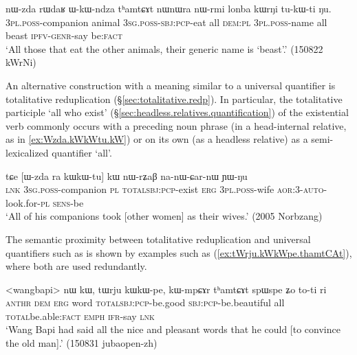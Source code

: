 \begin{exe}
\ex \label{ex:nWrmi.lonba}
\gll nɯ-zda rɯdaʁ ɯ-kɯ-ndza tʰamtɕɤt nɯnɯra nɯ-rmi lonba kɯrŋi tu-kɯ-ti ŋu. \\
\textsc{3pl}.\textsc{poss}-companion animal \textsc{3sg}.\textsc{poss}-\textsc{sbj}:\textsc{pcp}-eat all \textsc{dem}:\textsc{pl} \textsc{3pl}.\textsc{poss}-name all beast \textsc{ipfv}-\textsc{genr}-say be:\textsc{fact} \\ 
 \glt `All those that eat the other animals, their generic name is `beast'.'  (150822 kWrNi)
\end{exe}
 
An alternative construction with a meaning similar to a universal quantifier is totalitative reduplication (§\ref{sec:totalitative.redp}). In particular, the totalitative participle  `all who exist' (§\ref{sec:headless.relatives.quantification}) of the existential verb  commonly occurs with a preceding noun phrase (in a head-internal relative, as in \ref{ex:Wzda.kWkWtu.kW}) or on its own (as a headless relative) as a semi-lexicalized quantifier `all'. 

\begin{exe}
\ex \label{ex:Wzda.kWkWtu.kW}
\gll tɕe [ɯ-zda ra kɯ\redp{}kɯ-tu] kɯ nɯ-rʑaβ na-nɯ-ɕar-nɯ ɲɯ-ŋu \\
\textsc{lnk} \textsc{3sg}.\textsc{poss}-companion \textsc{pl} \textsc{total}\redp{}\textsc{sbj}:\textsc{pcp}-exist \textsc{erg} \textsc{3pl}.\textsc{poss}-wife \textsc{aor}:3\flobv{}-\textsc{auto}-look.for-\textsc{pl} \textsc{sens}-be \\
\glt `All of his companions took [other women] as their wives.' (2005 Norbzang)
\end{exe}
  
The semantic proximity between totalitative reduplication and universal quantifiers such as  is shown by examples such as (\ref{ex:tWrju.kWkWpe.thamtCAt}), where both are used redundantly.

\begin{exe}
\ex \label{ex:tWrju.kWkWpe.thamtCAt}
\gll   <wangbapi> nɯ kɯ, tɯrju kɯ\redp{}kɯ-pe, kɯ-mpɕɤr tʰamtɕɤt spɯ\redp{}spe ʑo to-ti ri \\
\textsc{anthr} \textsc{dem} \textsc{erg} word \textsc{total}\redp{}\textsc{sbj}:\textsc{pcp}-be.good \textsc{sbj}:\textsc{pcp}-be.beautiful all \textsc{total}\redp{}be.able:\textsc{fact} \textsc{emph} \textsc{ifr}-say \textsc{lnk} \\
\glt `Wang Bapi had said all the nice and pleasant words that he could [to convince the old man].' (150831 jubaopen-zh)
\end{exe}

